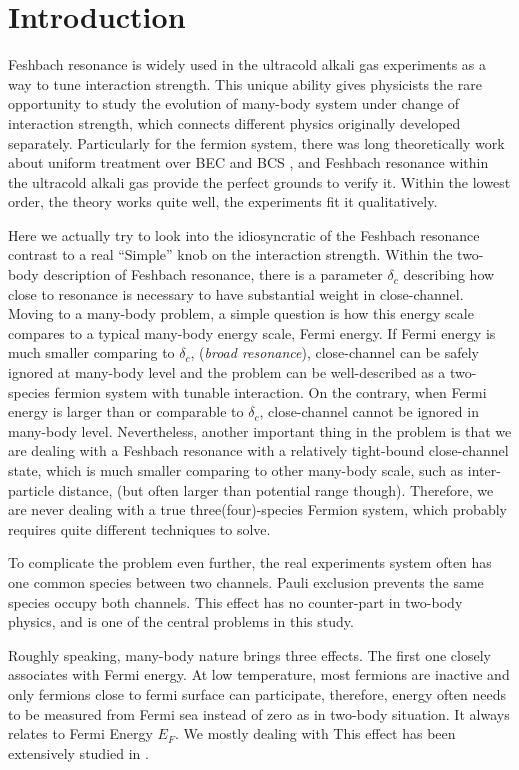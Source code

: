 
\chapter{Introduction}
Feshbach resonance is widely used in the ultracold alkali gas experiments as a way to tune interaction strength.  This unique ability gives physicists the rare opportunity to study the evolution of many-body system under change of interaction strength, which connects different physics originally developed separately.  Particularly for the fermion system, there was long theoretically work about uniform treatment over BEC and BCS \cite{Eagle,LeggettCrossover,Nozieres,RanderiaBEC}, and Feshbach resonance within the ultracold alkali gas provide the perfect grounds to verify it.  Within the lowest order, the theory works quite well, the experiments fit it qualitatively.  

Here we actually try to look into the idiosyncratic of the Feshbach resonance contrast to a real ``Simple'' knob on the interaction strength.  Within the two-body description of Feshbach resonance, there is a parameter $\delta_c$ describing how close to resonance is necessary to have substantial weight in close-channel.  Moving to a many-body problem, a simple question is how this energy scale compares to a typical many-body energy scale, Fermi energy.  If Fermi energy is much smaller comparing to $\delta_c$, (\emph{broad resonance}), close-channel can be safely ignored at many-body level and the problem can be well-described as a two-species fermion system with tunable interaction.  On the contrary, when Fermi energy is larger than or comparable to $\delta_c$, close-channel cannot be ignored in many-body level.  Nevertheless, another important thing in the problem is that we are dealing with a Feshbach resonance with a relatively tight-bound close-channel state, which is much smaller comparing to other many-body scale, such as inter-particle distance, (but often larger than potential range though).  Therefore, we are never dealing with a true three(four)-species Fermion system, which probably requires quite different techniques to solve.

To complicate the problem even further, the real experiments system often has one common species between two channels.  Pauli exclusion prevents the same species occupy both channels.  This effect has no counter-part in two-body physics, and is one of the central problems in this study. 

Roughly speaking, many-body nature brings three effects.  The first one closely associates with Fermi energy.  At low temperature, most fermions are inactive and only fermions close to fermi surface can participate, therefore, energy often needs to be measured from Fermi sea instead of zero as in two-body situation.  It always relates to Fermi Energy $E_F$.    We mostly dealing with This effect has been extensively studied in \cite{GurarieNarrow}.

